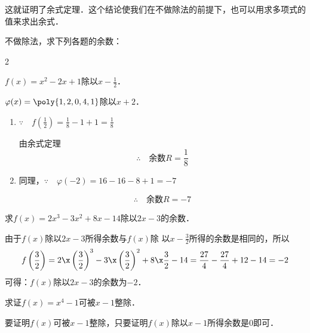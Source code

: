    这就证明了余式定理．这个结论使我们在不做除法的前提下，也可以用求多项式的值来求出余式．


\begin{example}
  不做除法，求下列各题的余数：
  \begin{enumerate}
    \begin{multicols}{2}
      \item $f(x)=x^2-2x+1$除以$x-\frac{1}{2}$．
      \item $\varphi(x)=\poly{1,2,0,4,1}$除以$x+2$．
    \end{multicols}
  \end{enumerate}
\end{example}    
    


\begin{solution}
\begin{enumerate}
    \item $\because\quad f\left(\frac{1}{2}\right)=\frac{1}{8}-1+1=\frac{1}{8}$
    
    由余式定理
    \[\therefore\quad \text{余数}R=\frac{1}{8}\]

\item 同理，$\because\quad \varphi(-2)=16-16-8+1=-7$

\[\therefore\quad \text{余数}R=-7\]
\end{enumerate}

    
\end{solution}


\begin{example}
    求$f(x)=2x^3-3x^2+8x-14$除以$2x-3$的余数．
\end{example}

\begin{solution}
    由于$f(x)$除以$2x-3$所得余数与$f(x)$除
    以$x-\frac{3}{2}$所得的余数是相同的，所以
\[
f\left(\frac{3}{2}\right)=2\x\left(\frac{3}{2}\right)^3-3\x\left(\frac{3}{2}\right)^2+8\x\frac{3}{2}-14\\
=\frac{27}{4}-\frac{27}{4}+12-14=-2
\]
可得：$f(x)$除以$2x-3$的余数为$-2$．
\end{solution}

\begin{example}
 求证$f(x)=x^4-1$可被$x-1$整除．   
\end{example}

\begin{analyze}
   要证明$f(x)$可被$x-1$整除，只要证明$f(x)$除以$x-1$所得余数是0即可．
\end{analyze}

